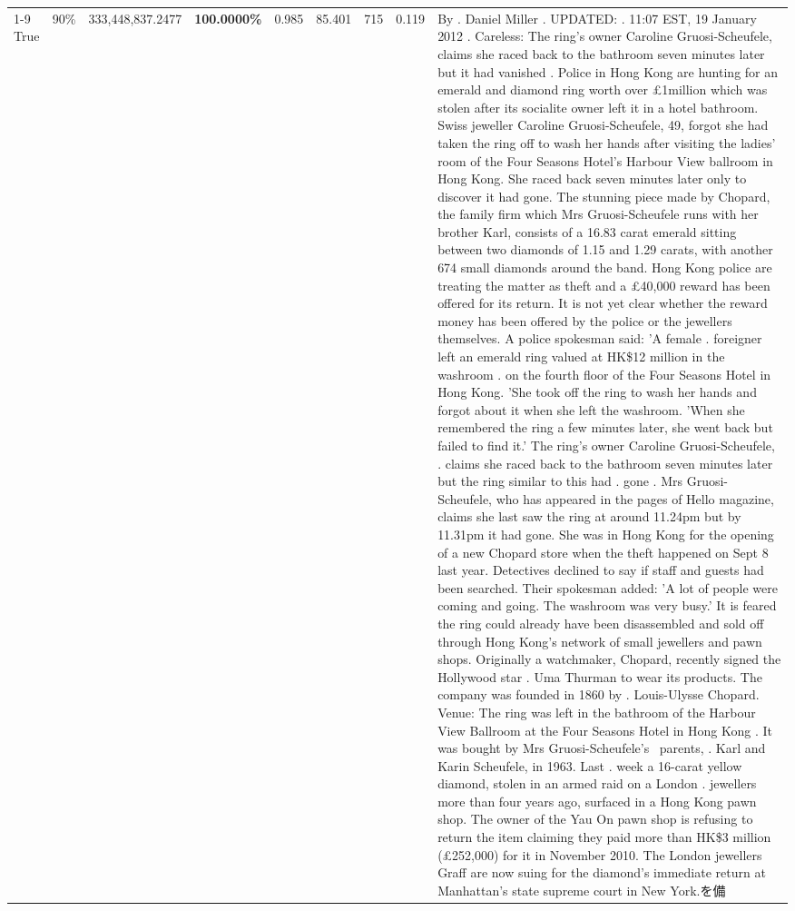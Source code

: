 \begin{table}[H]
\begin{tabular}{lllrlllll}
\cline{1-9} \cline{2-9}
True & 90\% & 333,448,837.2477 & \bfseries \color{red} 100.0000\% & 0.985 & 85.401 & 715 & 0.119 & By . Daniel Miller . UPDATED: . 11:07 EST, 19 January 2012 . Careless: The ring's owner Caroline Gruosi-Scheufele, claims she raced back to the bathroom seven minutes later but it had vanished . Police in Hong Kong are hunting for an emerald and diamond ring worth over £1million which was stolen after its socialite owner left it in a hotel bathroom. Swiss jeweller Caroline Gruosi-Scheufele, 49, forgot she had taken the ring off to wash her hands after visiting the ladies' room of the Four Seasons Hotel's Harbour View ballroom in Hong Kong. She raced back seven minutes later only to discover it had gone. The stunning piece made by Chopard, the family firm which Mrs Gruosi-Scheufele runs with her brother Karl, consists of a 16.83 carat emerald sitting between two diamonds of 1.15 and 1.29 carats, with another 674 small diamonds around the band. Hong Kong police are treating the matter as theft and a £40,000 reward has been offered for its return. It is not yet clear whether the reward money has been offered by the police or the jewellers themselves. A police spokesman said: 'A female . foreigner left an emerald ring valued at HK\$12 million in the washroom . on the fourth floor of the Four Seasons Hotel in Hong Kong. 'She took off the ring to wash her hands and forgot about it when she left the washroom. 'When she remembered the ring a few minutes later, she went back but failed to find it.' The ring's owner Caroline Gruosi-Scheufele, . claims she raced back to the bathroom seven minutes later but the ring similar to this had . gone . Mrs Gruosi-Scheufele, who has appeared in the pages of Hello magazine, claims she last saw the ring at around 11.24pm but by 11.31pm it had gone. She was in Hong Kong for the opening of a new Chopard store when the theft happened on Sept 8 last year. Detectives declined to say if staff and guests had been searched. Their spokesman added: 'A lot of people were coming and going. The washroom was very busy.' It is feared the ring could already have been disassembled and sold off through Hong Kong's network of small jewellers and pawn shops. Originally a watchmaker, Chopard, recently signed the Hollywood star . Uma Thurman to wear its products. The company was founded in 1860 by . Louis-Ulysse Chopard. Venue: The ring was left in the bathroom of the Harbour View Ballroom at the Four Seasons Hotel in Hong Kong . It was bought by Mrs Gruosi-Scheufele's  parents, . Karl and Karin Scheufele, in 1963. Last . week a 16-carat yellow diamond, stolen in an armed raid on a London . jewellers more than four years ago, surfaced in a Hong Kong pawn shop. The owner of the Yau On pawn shop is refusing to return the item claiming they paid more than HK\$3 million (£252,000) for it in November 2010. The London jewellers Graff are now suing for the diamond’s immediate return at Manhattan’s state supreme court in New York.を備 \\

\end{tabular}
\end{table}
